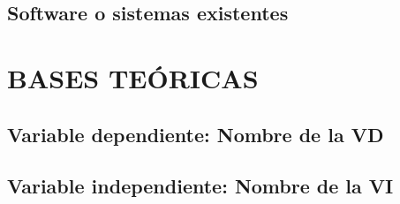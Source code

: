 \lipsum[7]

\subsection{Software o sistemas existentes}

\lipsum[8]

\section{BASES TEÓRICAS}

\subsection{Variable dependiente: Nombre de la VD}

\lipsum[9]

\subsection{Variable independiente: Nombre de la VI}

\lipsum[10]

